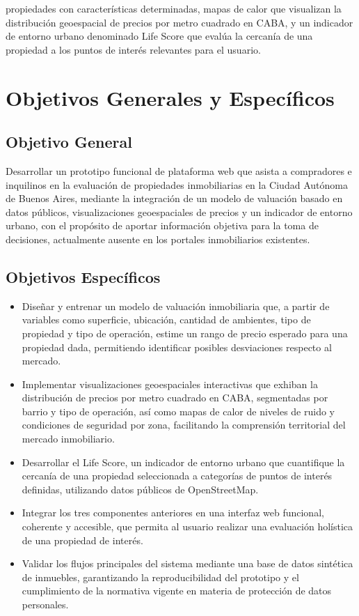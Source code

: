 propiedades con características determinadas, mapas de calor que visualizan la distribución geoespacial de precios por metro cuadrado en CABA, y un indicador de entorno urbano denominado Life Score que evalúa la cercanía de una propiedad a los puntos de interés relevantes para el usuario.

\section{Objetivos Generales y Específicos}

\subsection{Objetivo General}

Desarrollar un prototipo funcional de plataforma web que asista a compradores e inquilinos en la evaluación de propiedades inmobiliarias en la Ciudad Autónoma de Buenos Aires, mediante la integración de un modelo de valuación basado en datos públicos, visualizaciones geoespaciales de precios y un indicador de entorno urbano, con el propósito de aportar información objetiva para la toma de decisiones, actualmente ausente en los portales inmobiliarios existentes.

\subsection{Objetivos Específicos}

\begin{itemize}
\item Diseñar y entrenar un modelo de valuación inmobiliaria que, a partir de variables como superficie, ubicación, cantidad de ambientes, tipo de propiedad y tipo de operación, estime un rango de precio esperado para una propiedad dada, permitiendo identificar posibles desviaciones respecto al mercado.
\item Implementar visualizaciones geoespaciales interactivas que exhiban la distribución de precios por metro cuadrado en CABA, segmentadas por barrio y tipo de operación, así como mapas de calor de niveles de ruido y condiciones de seguridad por zona, facilitando la comprensión territorial del mercado inmobiliario.
\item Desarrollar el Life Score, un indicador de entorno urbano que cuantifique la cercanía de una propiedad seleccionada a categorías de puntos de interés definidas, utilizando datos públicos de OpenStreetMap.
\item Integrar los tres componentes anteriores en una interfaz web funcional, coherente y accesible, que permita al usuario realizar una evaluación holística de una propiedad de interés.
\item Validar los flujos principales del sistema mediante una base de datos sintética de inmuebles, garantizando la reproducibilidad del prototipo y el cumplimiento de la normativa vigente en materia de protección de datos personales.
\end{itemize}

